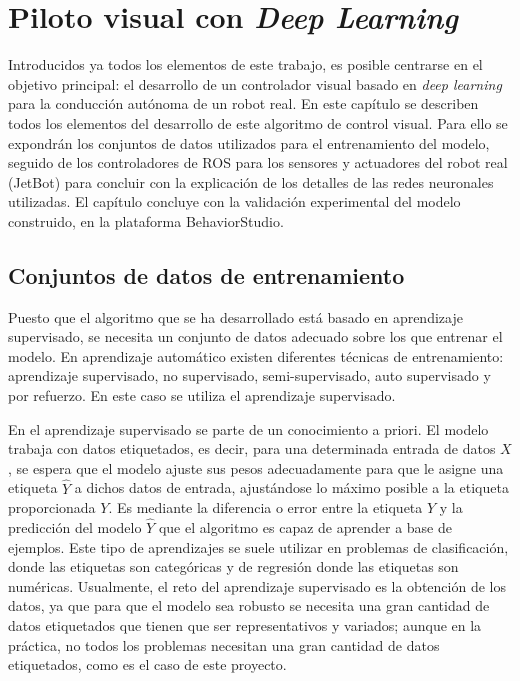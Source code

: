 \chapter{Piloto visual con \textit{Deep Learning}}

Introducidos ya todos los elementos de este trabajo, es posible centrarse en el objetivo principal: el desarrollo de un controlador visual basado en \textit{deep learning} para la conducción autónoma de un robot real. En este capítulo se describen todos los elementos del desarrollo de este algoritmo de control visual. Para ello se expondrán los conjuntos de datos utilizados para el entrenamiento del modelo, seguido de los controladores de ROS para los sensores y actuadores del robot real (JetBot) para concluir con la explicación de los detalles de las redes neuronales utilizadas. El capítulo concluye con la validación experimental del modelo construido, en la plataforma BehaviorStudio.

\section{Conjuntos de datos de entrenamiento}
\label{sec:datasets}

Puesto que el algoritmo que se ha desarrollado está basado en aprendizaje supervisado, se necesita un conjunto de datos adecuado sobre los que entrenar el modelo. En aprendizaje automático existen diferentes técnicas de entrenamiento: aprendizaje supervisado, no supervisado, semi-supervisado, auto supervisado y por refuerzo. En este caso se utiliza el aprendizaje supervisado.

En el aprendizaje supervisado se parte de un conocimiento a priori. El modelo trabaja con datos etiquetados, es decir, para una determinada entrada de datos $X$, se espera que el modelo ajuste sus pesos adecuadamente para que le asigne una etiqueta $\hat Y$ a dichos datos de entrada, ajustándose lo máximo posible a la etiqueta proporcionada $Y$. Es mediante la diferencia o error entre la etiqueta $Y$ y la predicción del modelo $\hat Y$ que el algoritmo es capaz de aprender a base de ejemplos. Este tipo de aprendizajes se suele utilizar en problemas de clasificación, donde las etiquetas son categóricas y de regresión donde las etiquetas son numéricas. Usualmente, el reto del aprendizaje supervisado es la obtención de los datos, ya que para que el modelo sea robusto se necesita una gran cantidad de datos etiquetados que tienen que ser representativos y variados; aunque en la práctica, no todos los problemas necesitan una gran cantidad de datos etiquetados, como es el caso de este proyecto.

